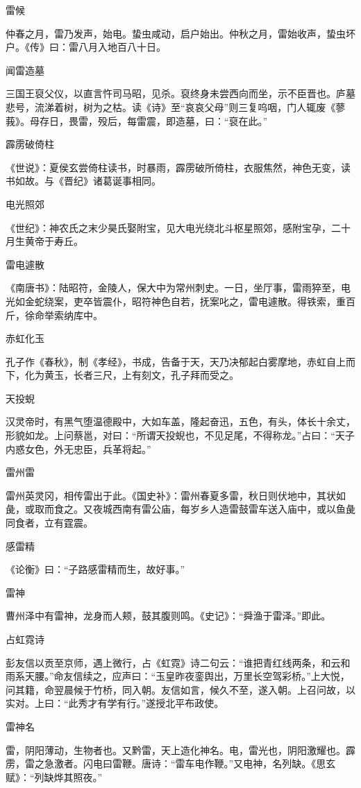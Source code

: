\documentclass[a4paper,12pt,UTF8,twoside]{ctexbook}
\begin{document}
	雷候
	
	仲春之月，雷乃发声，始电。蛰虫咸动，启户始出。仲秋之月，雷始收声，蛰虫坏户。《传》曰：雷八月入地百八十日。
	
	闻雷造墓
	
	三国王裒父仪，以直言忤司马昭，见杀。裒终身未尝西向而坐，示不臣晋也。庐墓悲号，流涕着树，树为之枯。读《诗》至“哀哀父母”则三复呜咽，门人辄废《蓼莪》。母存日，畏雷，殁后，每雷震，即造墓，曰：“裒在此。”
	
	霹雳破倚柱
	
	《世说》：夏侯玄尝倚柱读书，时暴雨，霹雳破所倚柱，衣服焦然，神色无变，读书如故。与《晋纪》诸葛诞事相同。
	
	电光照郊
	
	《世纪》：神农氏之末少昊氏娶附宝，见大电光绕北斗枢星照郊，感附宝孕，二十月生黄帝于寿丘。
	
	雷电遽散
	
	《南唐书》：陆昭符，金陵人，保大中为常州刺史。一日，坐厅事，雷雨猝至，电光如金蛇绕案，吏卒皆震仆，昭符神色自若，抚案叱之，雷电遽散。得铁索，重百斤，徐命举索纳库中。
	
	赤虹化玉
	
	孔子作《春秋》，制《孝经》，书成，告备于天，天乃决郁起白雾摩地，赤虹自上而下，化为黄玉，长者三尺，上有刻文，孔子拜而受之。
	
	天投蜺
	
	汉灵帝时，有黑气堕温德殿中，大如车盖，隆起奋迅，五色，有头，体长十余丈，形貌如龙。上问蔡邕，对曰：“所谓天投蜺也，不见足尾，不得称龙。”占曰：“天子内惑女色，外无忠臣，兵革将起。”
	
	雷州雷
	
	雷州英灵冈，相传雷出于此。《国史补》：雷州春夏多雷，秋日则伏地中，其状如彘，或取而食之。又夜城西南有雷公庙，每岁乡人造雷鼓雷车送入庙中，或以鱼彘同食者，立有霆震。
	
	感雷精
	
	《论衡》曰：“子路感雷精而生，故好事。”
	
	雷神
	
	曹州泽中有雷神，龙身而人颊，鼓其腹则鸣。《史记》：“舜渔于雷泽。”即此。
	
	占虹霓诗
	
	彭友信以贡至京师，遇上微行，占《虹霓》诗二句云：“谁把青红线两条，和云和雨系天腰。”命友信续之，应声曰：“玉皇昨夜銮舆出，万里长空驾彩桥。”上大悦，问其籍，命翌晨候于竹桥，同入朝。友信如言，候久不至，遂入朝。上召问故，以实对。上曰：“此秀才有学有行。”遂授北平布政使。
	
	雷神名
	
	雷，阴阳薄动，生物者也。又黔雷，天上造化神名。电，雷光也，阴阳激耀也。霹雳，雷之急激者。闪电曰雷鞭。唐诗：“雷车电作鞭。”又电神，名列缺。《思玄赋》：“列缺烨其照夜。”
	
\end{document}
